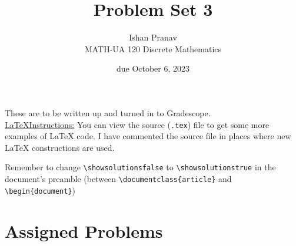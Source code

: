 \documentclass{article}
\title{Problem Set 3}
\author{
    Ishan Pranav
\\  MATH-UA 120 Discrete Mathematics
}
\date{due October 6, 2023}
\newif\ifshowsolutions
\newcommand{\danger}{\marginpar[\hfill\dbend]{\dbend\hfill}}
\theoremstyle{definition}
\begin{document}
\maketitle
These are to be written up and turned in to Gradescope.\\
\ifshowsolutions
    \SetupExSheets{solution/print=true}
\else
    \danger
 \underline{ \LaTeX  Instructions:}  You can view the source (\texttt{.tex}) file to get some more examples of \LaTeX{} code.  I have commented the source file in places where new \LaTeX{} constructions are used.
  
  Remember to change \verb|\showsolutionsfalse| to \verb|\showsolutionstrue|
    in the document's preamble 
    (between \verb|\documentclass{article}| and \verb|\begin{document}|)
\fi
\section*{Assigned Problems}
\end{document}
